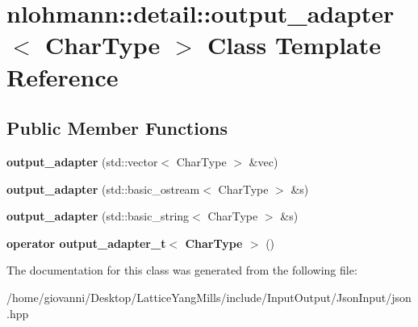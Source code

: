 \hypertarget{classnlohmann_1_1detail_1_1output__adapter}{}\section{nlohmann\+:\+:detail\+:\+:output\+\_\+adapter$<$ Char\+Type $>$ Class Template Reference}
\label{classnlohmann_1_1detail_1_1output__adapter}
\subsection*{Public Member Functions}
\begin{DoxyCompactItemize}
\item 
{\bfseries output\+\_\+adapter} (std\+::vector$<$ Char\+Type $>$ \&vec)\hypertarget{classnlohmann_1_1detail_1_1output__adapter_a117bda35bc3de85fd2f5f2153d9705b4}{}\label{classnlohmann_1_1detail_1_1output__adapter_a117bda35bc3de85fd2f5f2153d9705b4}

\item 
{\bfseries output\+\_\+adapter} (std\+::basic\+\_\+ostream$<$ Char\+Type $>$ \&s)\hypertarget{classnlohmann_1_1detail_1_1output__adapter_ac086bc101f246eb815e46f17a9e68a4a}{}\label{classnlohmann_1_1detail_1_1output__adapter_ac086bc101f246eb815e46f17a9e68a4a}

\item 
{\bfseries output\+\_\+adapter} (std\+::basic\+\_\+string$<$ Char\+Type $>$ \&s)\hypertarget{classnlohmann_1_1detail_1_1output__adapter_a07f996a817ffb420022cea56425f7d5c}{}\label{classnlohmann_1_1detail_1_1output__adapter_a07f996a817ffb420022cea56425f7d5c}

\item 
{\bfseries operator output\+\_\+adapter\+\_\+t$<$ Char\+Type $>$} ()\hypertarget{classnlohmann_1_1detail_1_1output__adapter_adee7a0e124f483d9945b8b85c73d7957}{}\label{classnlohmann_1_1detail_1_1output__adapter_adee7a0e124f483d9945b8b85c73d7957}

\end{DoxyCompactItemize}


The documentation for this class was generated from the following file\+:\begin{DoxyCompactItemize}
\item 
/home/giovanni/\+Desktop/\+Lattice\+Yang\+Mills/include/\+Input\+Output/\+Json\+Input/json.\+hpp\end{DoxyCompactItemize}
